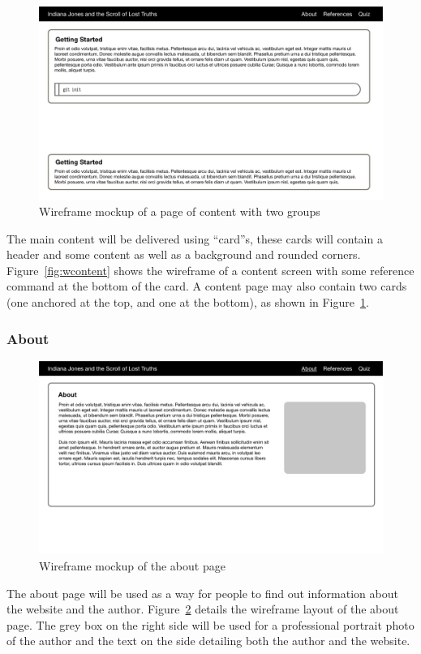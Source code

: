 \begin{figure}
	\centering
	\includegraphics[width=0.9\linewidth]{wireframe/web3}
	\caption{Wireframe mockup of a page of content with two groups}\label{fig:wcontent2}
\end{figure}

The main content will be delivered using ``card''s, these cards will contain a header and some content as well as a background and rounded corners. Figure~\ref{fig:wcontent} shows the wireframe of a content screen with some reference command at the bottom of the card. A content page may also contain two cards (one anchored at the top, and one at the bottom), as shown in Figure~\ref{fig:wcontent2}.

\subsubsection{About}
\begin{figure}
	\centering
	\includegraphics[width=0.9\linewidth]{wireframe/web4}
	\caption{Wireframe mockup of the about page}\label{fig:wabout}	
\end{figure}

The about page will be used as a way for people to find out information about the website and the author. Figure~\ref{fig:wabout} details the wireframe layout of the about page. The grey box on the right side will be used for a professional portrait photo of the author and the text on the side detailing both the author and the website. 

